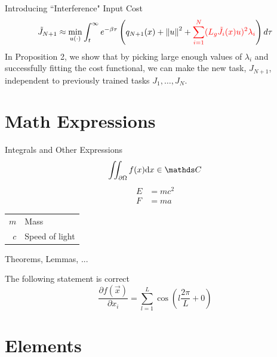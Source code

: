 \begin{frame}{Introducing ``Interference" Input Cost}
	\begin{align*}
                \tilde{J}_{N + 1} \approx \min_{u(\cdot)} \int_t^{\infty} e^{- \beta \tau } \left( q_{N + 1}(x) + { \lVert u \rVert }^2 + { \color{red} \sum_{i = 1}^N ( L_g \tilde{J}_i (x) u)^2 \lambda_i } \right) d \tau
        \end{align*}
	\seprule
	In Proposition 2, we show that by picking large enough values of $\lambda_i$ and successfully fitting the cost functional, we can make the new task, $J_{N + 1}$, independent to previously trained tasks $J_1, \ldots, J_N$. 
\end{frame}

\begin{frame}
\end{frame}



\section{Math Expressions}
\begin{frame}{Integrals and Other Expressions}
	\begin{equation}
		\iint_{\partial\Omega}f(x)\diff{x} \in \complexes
	\end{equation}
	\begin{align}
		E &= mc^2\\
		F &= ma
	\end{align}

	\seprule
	
	\begin{tabular}{rl}
		$m$ & Mass\\
		$c$ & Speed of light
	\end{tabular}
\end{frame}
\begin{frame}{Theorems, Lemmas, ...}
	\begin{thm}
		The following statement is correct
		\begin{equation}
			\frac{\partial f(\vec{x})}{\partial x_i} = \sum_{l=1}^{L}\cos\left(l\frac{2\pi}{L} + 0\right)
		\end{equation}
	\end{thm}
\end{frame}

\section{Elements}

